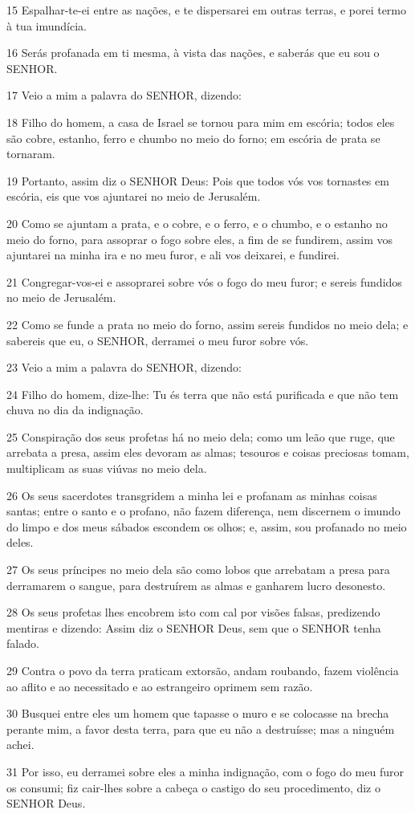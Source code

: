 \par 15 Espalhar-te-ei entre as nações, e te dispersarei em outras terras, e porei termo à tua imundícia.
\par 16 Serás profanada em ti mesma, à vista das nações, e saberás que eu sou o SENHOR.
\par 17 Veio a mim a palavra do SENHOR, dizendo:
\par 18 Filho do homem, a casa de Israel se tornou para mim em escória; todos eles são cobre, estanho, ferro e chumbo no meio do forno; em escória de prata se tornaram.
\par 19 Portanto, assim diz o SENHOR Deus: Pois que todos vós vos tornastes em escória, eis que vos ajuntarei no meio de Jerusalém.
\par 20 Como se ajuntam a prata, e o cobre, e o ferro, e o chumbo, e o estanho no meio do forno, para assoprar o fogo sobre eles, a fim de se fundirem, assim vos ajuntarei na minha ira e no meu furor, e ali vos deixarei, e fundirei.
\par 21 Congregar-vos-ei e assoprarei sobre vós o fogo do meu furor; e sereis fundidos no meio de Jerusalém.
\par 22 Como se funde a prata no meio do forno, assim sereis fundidos no meio dela; e sabereis que eu, o SENHOR, derramei o meu furor sobre vós.
\par 23 Veio a mim a palavra do SENHOR, dizendo:
\par 24 Filho do homem, dize-lhe: Tu és terra que não está purificada e que não tem chuva no dia da indignação.
\par 25 Conspiração dos seus profetas há no meio dela; como um leão que ruge, que arrebata a presa, assim eles devoram as almas; tesouros e coisas preciosas tomam, multiplicam as suas viúvas no meio dela.
\par 26 Os seus sacerdotes transgridem a minha lei e profanam as minhas coisas santas; entre o santo e o profano, não fazem diferença, nem discernem o imundo do limpo e dos meus sábados escondem os olhos; e, assim, sou profanado no meio deles.
\par 27 Os seus príncipes no meio dela são como lobos que arrebatam a presa para derramarem o sangue, para destruírem as almas e ganharem lucro desonesto.
\par 28 Os seus profetas lhes encobrem isto com cal por visões falsas, predizendo mentiras e dizendo: Assim diz o SENHOR Deus, sem que o SENHOR tenha falado.
\par 29 Contra o povo da terra praticam extorsão, andam roubando, fazem violência ao aflito e ao necessitado e ao estrangeiro oprimem sem razão.
\par 30 Busquei entre eles um homem que tapasse o muro e se colocasse na brecha perante mim, a favor desta terra, para que eu não a destruísse; mas a ninguém achei.
\par 31 Por isso, eu derramei sobre eles a minha indignação, com o fogo do meu furor os consumi; fiz cair-lhes sobre a cabeça o castigo do seu procedimento, diz o SENHOR Deus.

